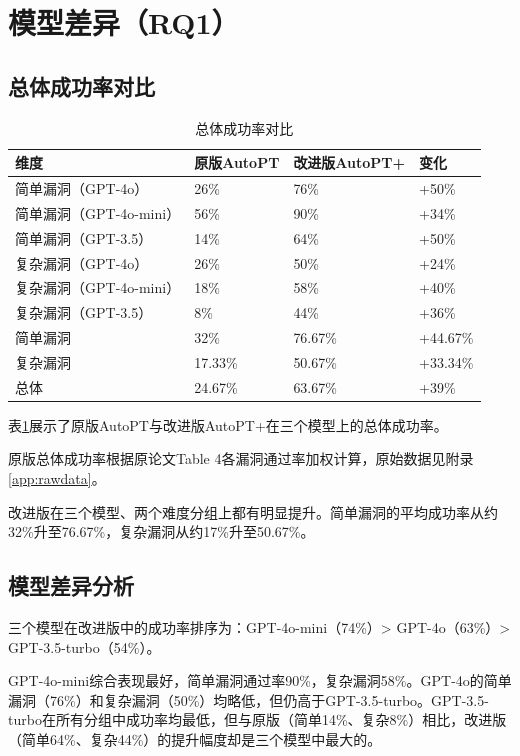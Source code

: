 \section{模型差异（RQ1）}

\subsection{总体成功率对比}

\begin{table}[htbp]
\centering
\caption{总体成功率对比} \label{tab:ch4:1}
  \renewcommand{\arraystretch}{1.3}
\begin{tabular}{llll}
    \toprule
维度 & 原版AutoPT & 改进版AutoPT+ & 变化 \\
    \midrule
简单漏洞（GPT-4o） & 26\% & 76\% & +50\% \\
    \midrule
简单漏洞（GPT-4o-mini） & 56\% & 90\% & +34\% \\
    \midrule
简单漏洞（GPT-3.5） & 14\% & 64\% & +50\% \\
    \midrule
复杂漏洞（GPT-4o） & 26\% & 50\% & +24\% \\
    \midrule
复杂漏洞（GPT-4o-mini） & 18\% & 58\% & +40\% \\
    \midrule
复杂漏洞（GPT-3.5） & 8\% & 44\% & +36\% \\
    \midrule
简单漏洞 & 32\% & 76.67\% & +44.67\% \\
    \midrule
复杂漏洞 & 17.33\% & 50.67\% & +33.34\% \\
    \midrule
总体 & 24.67\% & 63.67\% & +39\% \\
    \bottomrule
\end{tabular}
\end{table}

表\ref{tab:ch4:1}展示了原版AutoPT与改进版AutoPT+在三个模型上的总体成功率。

原版总体成功率根据原论文Table 4各漏洞通过率加权计算，原始数据见附录\ref{app:rawdata}。

改进版在三个模型、两个难度分组上都有明显提升。简单漏洞的平均成功率从约32\%升至76.67\%，复杂漏洞从约17\%升至50.67\%。

\subsection{模型差异分析}

三个模型在改进版中的成功率排序为：GPT-4o-mini（74\%）> GPT-4o（63\%）> GPT-3.5-turbo（54\%）。

GPT-4o-mini综合表现最好，简单漏洞通过率90\%，复杂漏洞58\%。GPT-4o的简单漏洞（76\%）和复杂漏洞（50\%）均略低，但仍高于GPT-3.5-turbo。GPT-3.5-turbo在所有分组中成功率均最低，但与原版（简单14\%、复杂8\%）相比，改进版（简单64\%、复杂44\%）的提升幅度却是三个模型中最大的。

